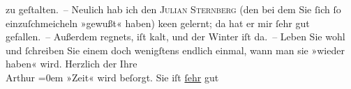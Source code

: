 \begin{ledgroupsized}[t]{13cm}
               zu geſtalten. – Neulich hab ich den \textsc{Julian Sternberg} (den bei dem Sie ſich ſo einzuſchmeicheln »gewußt« haben) ke{\geminationn}en gelernt; da hat er mir ſehr gut gefallen. –\pend
           \pstart
           {\pb}Außerdem regnets, iſt kalt, und der Winter iſt
               da. –\pend
           \pstart
           Leben Sie wohl und ſchreiben Sie einem doch wenigſtens endlich einmal, wann man sie
               »wieder haben« wird.\pend
           \pstart
           Herzlich der Ihre{\\[\baselineskip]}\spacefill\mbox{Arthur}\pend
           \leftskip=0em{}\pstart
           \noindent{}»Zeit« wird beſorgt. Sie iſt \uline{ſehr} gut\pend
           
         
         \endnumbering{}\end{ledgroupsized}  \newcommand{\dateiname}{L00382}\newcommand{\titel}{Arthur Schnitzler an Richard Beer-Hofmann, 15. 10. 1894}\newcommand{\editorInnen}{Martin Anton Müller und Gerd-Hermann Susen}
      